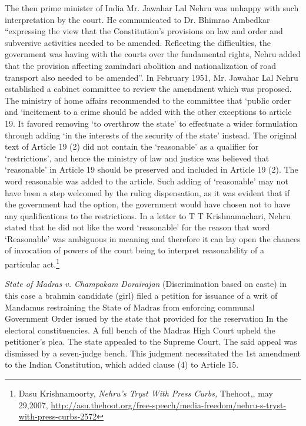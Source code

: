 \begin{multicols}{2}
\noi
The then prime minister of India Mr. Jawahar Lal Nehru was unhappy with such interpretation by the court. He communicated to Dr. Bhimrao Ambedkar “expressing the view that the Constitution’s provisions on law and order and subversive activities needed to be amended. Reflecting the difficulties, the government was having with the courts over the fundamental rights, Nehru added that the provision affecting zamindari abolition and nationalization of road transport also needed to be amended”. In February 1951, Mr. Jawahar Lal Nehru established a cabinet committee to review the amendment which was proposed. The ministry of home affairs recommended to the committee that ‘public order and ‘incitement to a crime should be added with the other exceptions to article 19. It favored removing ‘to overthrow the state’ to effectuate a wider formulation through adding ‘in the interests of the security of the state’ instead. The original text of Article 19 (2) did not contain the ‘reasonable’ as a qualifier for ‘restrictions’, and hence the ministry of law and justice was believed that ‘reasonable’ in Article 19 should be preserved and included in Article 19 (2). The word reasonable was added to the article. Such adding of ‘reasonable’ may not have been a step welcomed by the ruling dispensation, as it was evident that if the government had the option, the government would have chosen not to have any qualifications to the restrictions. In a letter to T T Krishnamachari, Nehru stated that he did not like the word ‘reasonable’ for the reason that word ‘Reasonable’ was ambiguous in meaning and therefore it can lay open the chances of invocation of powers of the court being to interpret reasonability of a particular act.\footnote{Dasu Krishnamoorty, \textit{Nehru’s Tryst With Press Curbs,} Thehoot,, may 29,2007, \url{http://asu.thehoot.org/free-speech/media-freedom/nehru-s-tryst-with-press-curbs-2572}}

\noi
\textit{State of Madras v. Champakam Dorairajan} (Discrimination based on caste) in this case a brahmin candidate (girl) filed a petition for issuance of a writ of Mandamus restraining the State of Madras from enforcing communal Government Order issued by the state that provided for the reservation In the electoral constituencies. A full bench of the Madras High Court upheld the petitioner's plea. The state appealed to the Supreme Court. The said appeal was dismissed by a seven-judge bench. This judgment necessitated the 1st amendment to the Indian Constitution, which added clause (4) to Article 15.


\end{multicols}
